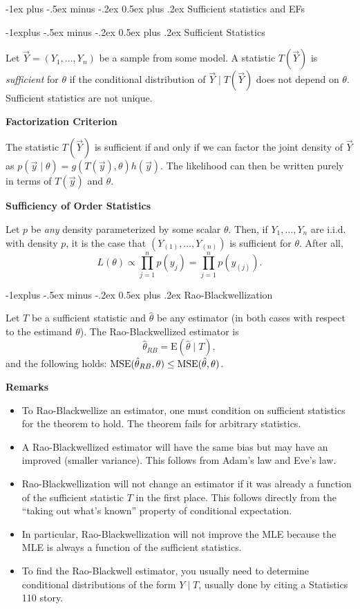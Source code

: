 \documentclass[10pt,landscape]{article}
\makeatletter
\renewcommand{\section}{\@startsection{section}{1}{0mm}%
                                {-1ex plus -.5ex minus -.2ex}%
                                {0.5ex plus .2ex}%
                                {\normalfont\large\bfseries}}
\renewcommand{\subsection}{\@startsection{subsection}{2}{0mm}%
                                {-1explus -.5ex minus -.2ex}%
                                {0.5ex plus .2ex}%
                                {\normalfont\normalsize\bfseries}}
\newcommand{\E}{\text{E}}
\makeatother
\begin{document}
\begin{multicols*}{3}
\section{Sufficient statistics and EFs}

\subsection{Sufficient Statistics}

Let $\vec Y=(Y_1,\dots,Y_n)$ be a sample from some model. A statistic $T(\vec Y)$ is \emph{sufficient} for $\theta$ if the conditional distribution of $\vec Y\mid T(\vec Y)$ does not depend on $\theta$. Sufficient statistics are not unique.

\textbf{Factorization Criterion}

The statistic $T(\vec Y)$ is sufficient if and only if we can factor the joint density of $\vec Y$ as $p(\vec y\mid \theta)=g(T(\vec y),\theta)h(\vec y)$. The likelihood can then be written purely in terms of $T(\vec y)$ and $\theta$.

\textbf{Sufficiency of Order Statistics}

Let $p$ be \emph{any} density parameterized by some scalar $\theta$. Then, if $Y_1,\dots,Y_n$ are i.i.d. with density $p$, it is the case that $(Y_{(1)},\dots,Y_{(n)})$ is sufficient for $\theta$. After all, $$L(\theta)\propto \prod_{j=1}^n p(y_j)=\prod_{j=1}^n p(y_{(j)}).$$

\subsection{Rao-Blackwellization}

Let $T$ be a sufficient statistic and $\hat{\theta}$ be any estimator (in both cases with respect to the estimand $\theta$). The Rao-Blackwellized estimator is $$\hat{\theta}_{RB}=\E (\hat{\theta}\mid T),$$ and the following holds: $\operatorname{MSE}(\hat{\theta}_{RB},\theta)\leq \operatorname{MSE}(\hat{\theta},\theta)$.

\textbf{Remarks}
\begin{itemize}
    \item To Rao-Blackwellize an estimator, one must condition on sufficient statistics for the theorem to hold. The theorem fails for arbitrary statistics.
    \item A Rao-Blackwellized estimator will have the same bias but may have an improved (smaller variance). This follows from Adam's law and Eve's law.
    \item Rao-Blackwellization will not change an estimator if it was already a function of the sufficient statistic $T$ in the first place. This follows directly from the ``taking out what's known'' property of conditional expectation.
    \item In particular, Rao-Blackwellization will not improve the MLE because the MLE is always a function of the sufficient statistics.
    \item To find the Rao-Blackwell estimator, you usually need to determine conditional distributions of the form $Y\mid T$, usually done by citing a Statistics 110 story.
\end{itemize}




\end{multicols*}
\end{document}
